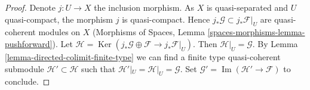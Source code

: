 \documentclass{stacks-project}
\theoremstyle{plain}
\theoremstyle{definition}
\theoremstyle{remark}
\numberwithin{equation}{subsection}
\def\Ker{\mathop{\mathrm{Ker}}}
\def\Im{\mathop{\mathrm{Im}}}
\begin{document}
\begin{proof}
Denote $j : U \to X$ the inclusion morphism. As $X$ is quasi-separated
and $U$ quasi-compact, the morphism $j$ is quasi-compact. Hence
$j_*\mathcal{G} \subset j_*\mathcal{F}|_U$ are quasi-coherent modules
on $X$ (Morphisms of Spaces, Lemma
\ref{spaces-morphisms-lemma-pushforward}).
Let $\mathcal{H} =
\Ker(j_*\mathcal{G} \oplus \mathcal{F} \to j_*\mathcal{F}|_U)$.
Then $\mathcal{H}|_U = \mathcal{G}$. By
Lemma \ref{lemma-directed-colimit-finite-type}
we can find a finite type quasi-coherent submodule
$\mathcal{H}' \subset \mathcal{H}$ such that
$\mathcal{H}'|_U = \mathcal{H}|_U = \mathcal{G}$.
Set $\mathcal{G}' = \Im(\mathcal{H}' \to \mathcal{F})$
to conclude.
\end{proof}
\end{document}
